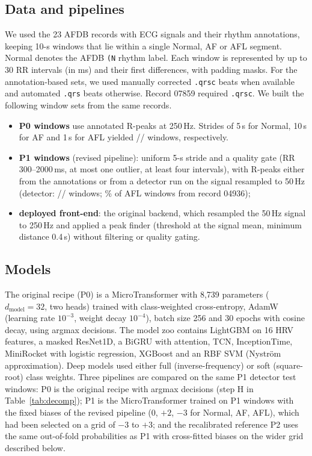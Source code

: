 \documentclass[conference,a4paper]{IEEEtran}
\begin{document}
\subsection{Data and pipelines}
We used the 23 AFDB records with ECG signals and their rhythm annotations, keeping 10-s windows that lie within a single
Normal, AF or AFL segment. Normal denotes the AFDB \texttt{(N} rhythm label. Each window is represented by up to 30 RR intervals
(in ms) and their first differences, with padding masks. For the annotation-based sets, we used manually corrected
\texttt{.qrsc} beats when available and automated \texttt{.qrs} beats otherwise. Record 07859 required \texttt{.qrsc}.
We built the following window sets from the same records.
\begin{itemize}
\item \textbf{P0 windows} use annotated R-peaks at 250\,Hz. Strides of 5\,s for Normal, 10\,s for AF and 1\,s for AFL
yielded \nNormLab/\nAfLab/\nAflLab{} windows, respectively.
\item \textbf{P1 windows} (revised pipeline): uniform 5-s stride and a quality gate (RR 300--2000\,ms, at most one outlier, at
least four intervals), with R-peaks either from the annotations or from a detector run on the signal resampled to 50\,Hz
(detector: \nNormDet/\nAfDet/\nAflDet{} windows; \share\% of AFL windows from record 04936);
\item \textbf{deployed front-end}: the original backend, which resampled the 50\,Hz signal to 250\,Hz and applied a peak finder
(threshold at the signal mean, minimum distance 0.4\,s) without filtering or quality gating.
\end{itemize}

\subsection{Models}
The original recipe (P0) is a MicroTransformer with 8{,}739 parameters ($d_\text{model}=32$, two heads) trained with
class-weighted cross-entropy, AdamW (learning rate $10^{-3}$, weight decay $10^{-4}$), batch size 256 and 30 epochs with cosine
decay, using argmax decisions. The model zoo contains LightGBM on 16 HRV features, a masked ResNet1D, a BiGRU with attention, TCN,
InceptionTime, MiniRocket with logistic regression, XGBoost and an RBF SVM (Nystr\"om approximation). Deep models used either
full (inverse-frequency) or soft (square-root) class weights. Three pipelines are compared on the same P1 detector test
windows: P0 is the original recipe with argmax decisions (step H in Table~\ref{tab:decomp}); P1 is the MicroTransformer trained on
P1 windows with the fixed biases of the revised pipeline (0, $+2$, $-3$ for Normal, AF, AFL), which had been selected on a grid
of $-3$ to $+3$; and the recalibrated reference P2 uses the same out-of-fold probabilities as P1 with cross-fitted biases on the
wider grid described below.
\end{document}
